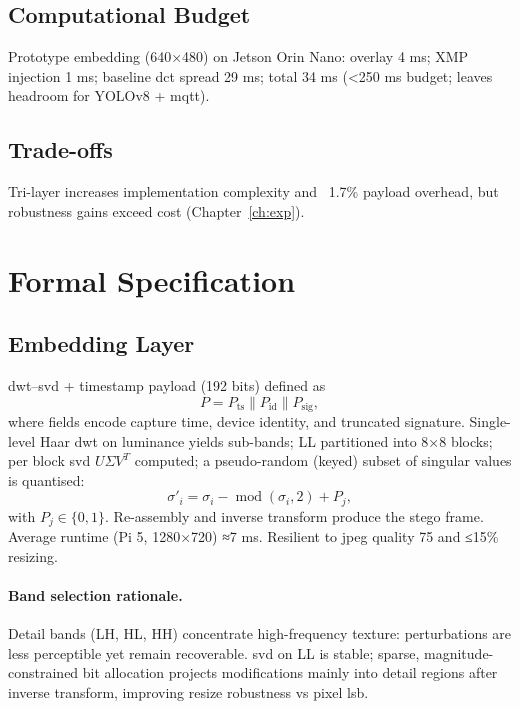 \subsection{Computational Budget}\label{subsec:computational-budget}
Prototype embedding (640×480) on Jetson Orin Nano: overlay 4 ms; XMP injection 1 ms; baseline \gls{dct} spread 29 ms; total 34 ms (<250 ms budget; leaves headroom for YOLOv8 + \gls{mqtt}).

\subsection{Trade-offs}\label{subsec:trade-offs}
Tri-layer increases implementation complexity and ~1.7\% payload overhead, but robustness gains exceed cost (Chapter~\ref{ch:exp}).

\section{Formal Specification}
\label{sec:deep_dive:spec}

\subsection{Embedding Layer}
\label{subsec:embedding-layer}
\gls{dwt}–\gls{svd} + timestamp payload (192 bits) defined as
\begin{equation}
  P = P_{\text{ts}} \parallel P_{\text{id}} \parallel P_{\text{sig}},
  \label{eq:p_payload}
\end{equation}
where fields encode capture time, device identity, and truncated signature.
Single-level Haar \gls{dwt} on luminance yields sub-bands; LL partitioned into 8×8 blocks; per block \gls{svd} $U\Sigma V^T$ computed; a pseudo-random (keyed) subset of singular values is quantised:
\begin{equation}
  \sigma'_i = \sigma_i - \operatorname{mod}(\sigma_i,2) + P_j,
  \label{eq:svd_quant}
\end{equation}
with $P_j\in\{0,1\}$.
Re-assembly and inverse transform produce the stego frame.
Average runtime (Pi 5, 1280×720) ≈7 ms.
Resilient to \gls{jpeg} quality 75 and ≤15\% resizing.

\paragraph{Band selection rationale.} Detail bands (LH, HL, HH) concentrate high-frequency texture: perturbations are less perceptible yet remain recoverable. \gls{svd} on LL is stable; sparse, magnitude-constrained bit allocation projects modifications mainly into detail regions after inverse transform, improving resize robustness vs pixel \gls{lsb}.

